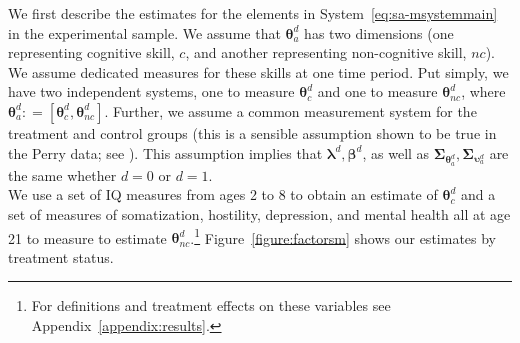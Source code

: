 \noindent We first describe the estimates for the elements in System~\eqref{eq:sa-msystemmain} in the experimental sample. We assume that $\bm{\theta}_{a}^d$ has two dimensions (one representing cognitive skill, $c$, and another representing non-cognitive skill, $nc$). We assume dedicated measures for these skills at one time period. Put simply, we have two independent systems, one to measure $\bm{\theta}_{c}^d$ and one to measure $\bm{\theta}_{nc}^d$, where $\bm{\theta}_{a}^d: = \left[ \bm{\theta}_{c}^d, \bm{\theta}_{nc}^d \right]$. Further, we assume a common measurement system for the treatment and control groups (this is a sensible assumption shown to be true in the Perry data; see \citealp{Heckman_Pinto_etal_2013_PerryFactor}). This assumption implies that $\bm{\lambda}^d, \bm{\beta}^d$, as well as $\bm{\Sigma}_{\bm{\theta}_{a}^d}, \bm{\Sigma}_{\bm{\upsilon}_{a}^d}$ are the same whether $d = 0$ or $d = 1$.\\

\noindent We use a set of IQ measures from ages 2 to 8 to obtain an estimate of $\bm{\theta}_{c}^d$ and a set of measures of somatization, hostility, depression, and mental health all at age 21 to measure to estimate $\bm{\theta}_{nc}^d$.\footnote{For definitions and treatment effects on these variables see Appendix~\ref{appendix:results}.} Figure~\ref{figure:factorsm} shows our estimates by treatment status.\\

